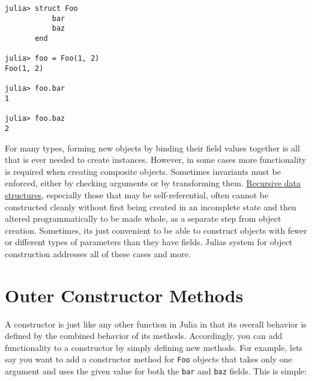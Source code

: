 \begin{verbatim}
julia> struct Foo
           bar
           baz
       end

julia> foo = Foo(1, 2)
Foo(1, 2)

julia> foo.bar
1

julia> foo.baz
2
\end{verbatim}



For many types, forming new objects by binding their field values together is all that is ever needed to create instances. However, in some cases more functionality is required when creating composite objects. Sometimes invariants must be enforced, either by checking arguments or by transforming them. \href{https://en.wikipedia.org/wiki/Recursion\_\%28computer\_science\%29\#Recursive\_data\_structures\_.28structural\_recursion.29}{Recursive data structures}, especially those that may be self-referential, often cannot be constructed cleanly without first being created in an incomplete state and then altered programmatically to be made whole, as a separate step from object creation. Sometimes, it{\textquotesingle}s just convenient to be able to construct objects with fewer or different types of parameters than they have fields. Julia{\textquotesingle}s system for object construction addresses all of these cases and more.





\hypertarget{8095711241800911617}{}


\section{Outer Constructor Methods}



A constructor is just like any other function in Julia in that its overall behavior is defined by the combined behavior of its methods. Accordingly, you can add functionality to a constructor by simply defining new methods. For example, let{\textquotesingle}s say you want to add a constructor method for \texttt{Foo} objects that takes only one argument and uses the given value for both the \texttt{bar} and \texttt{baz} fields. This is simple:




